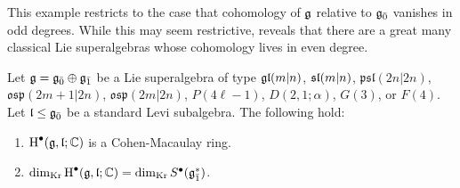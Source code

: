 This example restricts to the case that cohomology of $\g$ relative to $\even{\g}$ vanishes in odd degrees. While this may seem restrictive, \cite[Table 1]{BKN-1} reveals that there are a great many classical Lie superalgebras whose cohomology lives in even degree.

\begin{corollary}
  Let $\g = \even{\g} \oplus \odd{\g}$ be a Lie superalgebra of type $\gl(m|n)$, $\sl(m|n)$, $\mathfrak{psl}(2n|2n)$, $\mathfrak{osp}(2m+1|2n)$, $\mathfrak{osp}(2m|2n)$, $P(4\ell - 1)$, $D(2,1;\alpha)$, $G(3)$, or $F(4)$. Let $\l \leq \even{\g}$ be a standard Levi subalgebra. The following hold:
  \begin{enumerate}[\indent\rm(a)]
  \item $\H^\bullet(\g,\l;\CC)$ is a Cohen-Macaulay ring.
  \item $\krdim \H^\bullet(\g,\l;\CC) = \krdim S^\bullet(\odd{\g}^*)$.
  \end{enumerate}
\end{corollary}

